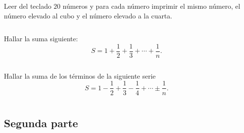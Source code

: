 \documentclass[spanish,addpoints,answers,a4paper]{exam}
\begin{document}
\begin{questions}
\begin{solution}
	\begin{listing}[H]
		\footnotesize
		\inputminted{cpp}{4_a.cc}
		\caption{Programa \texttt{4\textunderscore a.cc}.}
		\label{lst:3.4a}
	\end{listing}
\end{solution}

\question Leer del teclado $20$ números y para cada número imprimir el mismo número, el número elevado al cubo y el número elevado a la cuarta.

\begin{solution}
	\begin{listing}[H]
		\footnotesize
		\inputminted{cpp}{5_a.cc}
		\caption{Programa \texttt{5\textunderscore a.cc}.}
		\label{lst:3.5a}
	\end{listing}
\end{solution}

\question Hallar la suma siguiente:
\begin{equation*}
S = 1 + \frac{1}{2} + \frac{1}{3} + \cdots + \frac{1}{n}.
\end{equation*}

\begin{solution}
	\begin{listing}[H]
		\footnotesize
		\inputminted{cpp}{6_a.cc}
		\caption{Programa \texttt{6\textunderscore a.cc}.}
		\label{lst:3.6a}
	\end{listing}
\end{solution}

\question Hallar la suma de los términos de la siguiente serie
\begin{equation*}
S = 1 - \frac{1}{2} + \frac{1}{3} - \frac{1}{4} + \cdots  \pm \frac{1}{n}.
\end{equation*}

\begin{solution}
	\begin{listing}[H]
		\footnotesize
		\inputminted{cpp}{7_a.cc}
		\caption{Programa \texttt{7\textunderscore a.cc}.}
		\label{lst:3.7a}
	\end{listing}
\end{solution}

\end{questions}

\subsection*{Segunda parte}
\end{document}

